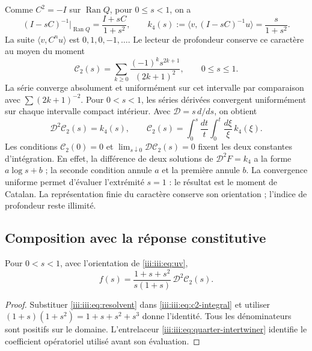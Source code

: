Comme $C^2=-I$ sur $\operatorname{Ran}Q$, pour $0\leq s<1$, on a
\begin{equation}
 (I-sC)^{-1}\big|_{\operatorname{Ran}Q}=\frac{I+sC}{1+s^2},
 \qquad k_4(s):=\langle v,(I-sC)^{-1}u\rangle=\frac{s}{1+s^2}.
 \label{iii:iii:eq:resolvent}
\end{equation}
La suite $\langle v,C^nu\rangle$ est $0,1,0,-1,\ldots$. Le lecteur
de profondeur conserve ce caractère au moyen du moment
\begin{equation}
 \mathcal C_2(s)=\sum_{k\geq0}\frac{(-1)^ks^{2k+1}}{(2k+1)^2},
 \qquad 0\leq s\leq1.
 \label{iii:iii:eq:c2}
\end{equation}
La série converge absolument et uniformément sur cet intervalle par
comparaison avec $\sum(2k+1)^{-2}$. Pour $0<s<1$, les séries dérivées
convergent uniformément sur chaque intervalle compact intérieur. Avec
$\mathcal D=s\,d/ds$, on obtient
\begin{equation}
 \mathcal D^2\mathcal C_2(s)=k_4(s),\qquad
 \mathcal C_2(s)=\int_0^s\frac{dt}{t}\int_0^t\frac{d\xi}{\xi}\,k_4(\xi).
 \label{iii:iii:eq:c2-integral}
\end{equation}
Les conditions $\mathcal C_2(0)=0$ et
$\lim_{s\downarrow0}\mathcal D\mathcal C_2(s)=0$ fixent les deux constantes
d’intégration. En effet, la différence de deux solutions de
$\mathcal D^2F=k_4$ a la forme $a\log s+b$ ; la seconde condition
annule $a$ et la première annule $b$.
La convergence uniforme permet d’évaluer l’extrémité $s=1$ : le résultat est
le moment de Catalan. La représentation finie du caractère conserve son
orientation ; l’indice de profondeur reste illimité.

\subsection{Composition avec la réponse constitutive}

\begin{theorem}
Pour $0<s<1$, avec l’orientation de \eqref{iii:iii:eq:uv},
\begin{equation}
 f(s)=\frac{1+s+s^2}{s(1+s)}\,\mathcal D^2\mathcal C_2(s).
 \label{iii:iii:eq:catalan-vacuum}
\end{equation}
\end{theorem}
\begin{proof}
Substituer \eqref{iii:iii:eq:resolvent} dans \eqref{iii:iii:eq:c2-integral} et utiliser
$(1+s)(1+s^2)=1+s+s^2+s^3$ donne l’identité. Tous les dénominateurs sont
positifs sur le domaine. L’entrelaceur \eqref{iii:iii:eq:quarter-intertwiner}
identifie le coefficient opératoriel utilisé avant son évaluation.
\end{proof}

